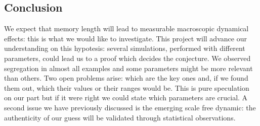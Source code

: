 \subsection{Conclusion}\label{subsec:conclusion}
%
%
%
%
 We expect that memory length will lead to measurable macroscopic
 dynamical effects: this is what we would like to investigate.
 This project will advance our understanding on this hypotesis:
 several simulations, performed with different parameters, could lead
 us to a proof which decides the conjecture.
 We observed segregation in almost all examples and some parameters might be
 more relevant than others. Two open problems arise: which are the key ones
 and, if we found them out, which their values or their ranges would be.
 This is pure speculation on our part but if it were right we could
 state which parameters are crucial.
 A second issue we have previously discussed is the emerging scale
 free dynamic: the authenticity of our guess will be validated
 through statistical observations.
 
